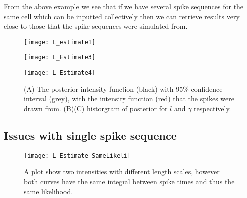\documentclass[../main.tex]{subfiles}
\begin{document}
From the above example we see that if we have several spike sequences for the same cell which can be inputted collectively then we can retrieve results very close to those that the spike sequences were simulated from. %
   
\begin{figure}
	\begin{subfloat}[]{
	\texttt{[image: L\_estimate1]}}
	\end{subfloat}
	\begin{subfloat}[]{
	\texttt{[image: L\_Estimate3]}}
	\end{subfloat}
	\begin{subfloat}[]{
	\texttt{[image: L\_Estimate4]}}
	\end{subfloat}	
		\caption{(A) The posterior intensity function (black) with 95\% confidence interval (grey), with the intensity function (red) that the spikes were drawn from. (B)(C) historgram of posterior for $l$ and $\gamma$ respectively. }
\label{fig: L_Estimate1}
\end{figure}


\subsection{Issues with single spike sequence}

\begin{figure}[t]
	\texttt{[image: L\_Estimate\_SameLikeli]}
	\caption{A plot show two intensities with different length scales, however both curves have the same integral between spike times and thus the same likelihood.}
	\label{fig: LEstimate_EqualLikeli}
\end{figure}
\end{document}
